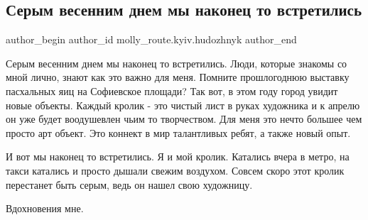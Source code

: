  
 
 
 
 

\subsection{Серым весенним днем мы наконец то встретились}
\label{sec:14_03_2018.fb.molly_route.kyiv.hudozhnyk.1.serym_vesennim_dnem_my_nakonec_to_vstretilis}

\ifcmt
 author_begin
   author_id molly_route.kyiv.hudozhnyk
 author_end
\fi

Серым весенним днем мы наконец то встретились. Люди, которые знакомы со мной
лично, знают как это важно для меня. Помните прошлогоднюю выставку пасхальных
яиц на Софиевское площади? Так вот, в этом году город увидит новые объекты.
Каждый кролик - это чистый лист в руках художника и к апрелю он уже будет
воодушевлен чьим то творчеством. Для меня это нечто большее чем просто арт
объект. Это коннект в мир талантливых ребят, а также новый опыт.

И вот мы наконец то встретились. Я и мой кролик. Катались вчера в метро, на
такси катались и просто дышали свежим воздухом. Совсем скоро этот кролик
перестанет быть серым, ведь он нашел свою художницу.

Вдохновения мне.

